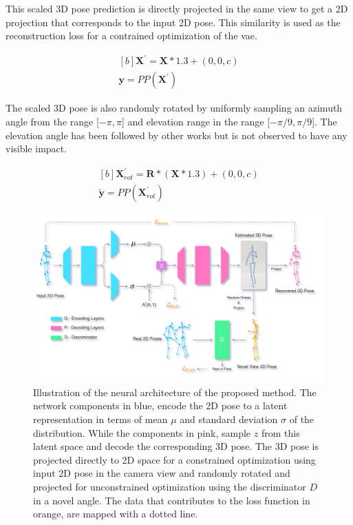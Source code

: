 This scaled 3D pose prediction is directly projected in the same view to get a 2D projection that corresponds to the input 2D pose.  This similarity is used as the reconstruction loss for a contrained optimization of the \ac{vae}.

\begin{equation} \label{eqn:proj_direct}
    \begin{gathered}[b]
        \textbf{X}^\prime = \textbf{X}*1.3 + (0,0,c) \\
        \textbf{y} = PP(\textbf{X}^\prime)
    \end{gathered}
\end{equation}

The scaled 3D pose is also randomly rotated by uniformly sampling an azimuth angle from the range [$-\pi, \pi$] and elevation range in the range [$-\pi/9, \pi/9$].  The elevation angle has been followed by other works but is not observed to have any visible impact.

\begin{equation} \label{eqn:proj_rotated}
    \begin{gathered}[b]
        \textbf{X}^\prime_{rot} = \textbf{R} * (\textbf{X}*1.3) + (0,0,c) \\
        \tilde{\textbf{y}} = PP(\textbf{X}^\prime_{rot})
    \end{gathered}
\end{equation}


\begin{figure}[h]
    \centering
    \includegraphics[width=\textwidth]{figures/arch/method_arch.png}
    \caption{Illustration of the neural architecture of the proposed method. The network components in blue, encode the 2D pose to a latent representation in terms of mean $\mu$ and standard deviation $\sigma$ of the distribution. While the components in pink, sample $z$ from this latent space and decode the corresponding 3D pose. The 3D pose is projected directly to 2D space for a constrained optimization using input 2D pose in the camera view and randomly rotated and projected for unconstrained optimization using the discriminator $D$ in a novel angle. The data that contributes to the loss function in orange, are mapped with a dotted line.
    }
    \label{fig:method_arch}
\end{figure}

